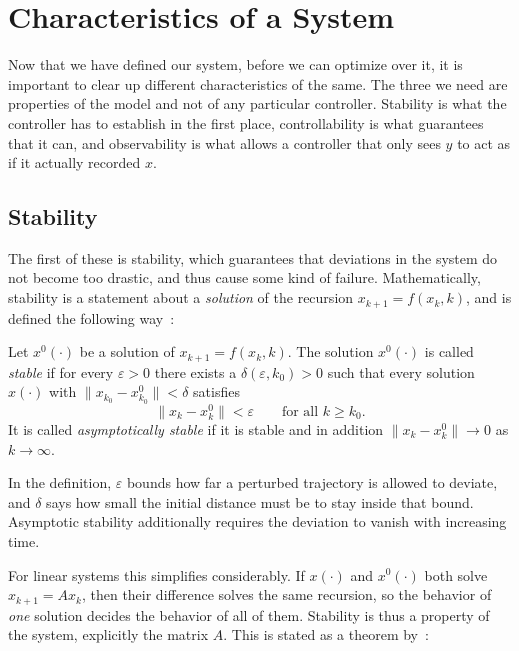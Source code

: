 \section{Characteristics of a System}
\label{sec:characteristics}

Now that we have defined our system, before we can optimize over it, it
is important to clear up different characteristics of the same. The three we
need are properties of the model and not of any particular controller.
Stability is what the controller has to establish in the first place,
controllability is what guarantees that it can, and observability is what
allows a controller that only sees $y$ to act as if it actually recorded $x$.

\subsection{Stability}
\label{subsec:stability}

The first of these is stability, which guarantees that deviations in the system
do not become too drastic, and thus cause some kind of failure. Mathematically,
stability is a statement about a \emph{solution} of the recursion
$x_{k+1} = f(x_k, k)$, and is defined the following
way~:

\begin{definition}[Stability]
\label{def:stability}
Let $x^{0}(\cdot)$ be a solution of $x_{k+1} = f(x_k, k)$. The solution
$x^{0}(\cdot)$ is called \emph{stable} if for every $\varepsilon > 0$ there
exists a $\delta(\varepsilon, k_0) > 0$ such that every solution $x(\cdot)$ with
$\lVert x_{k_0} - x^{0}_{k_0} \rVert < \delta$ satisfies
\begin{equation*}
    \lVert x_k - x^{0}_k \rVert < \varepsilon
    \qquad \text{for all } k \ge k_0 .
\end{equation*}
It is called \emph{asymptotically stable} if it is stable and in addition
$\lVert x_k - x^{0}_k \rVert \to 0$ as $k \to \infty$.
\end{definition}

In the definition, $\varepsilon$ bounds how far a perturbed
trajectory is allowed to deviate, and $\delta$ says how small the initial
distance must be to stay inside that bound. Asymptotic stability additionally requires 
the deviation to vanish with increasing time.

For linear systems this simplifies considerably. If $x(\cdot)$ and $x^{0}(\cdot)$
both solve $x_{k+1} = A x_k$, then their difference solves the same recursion,
so the behavior of \emph{one} solution decides the behavior of all of them.
Stability is thus a property of the system, explicitly the matrix $A$. 
This is stated as a theorem by~:

